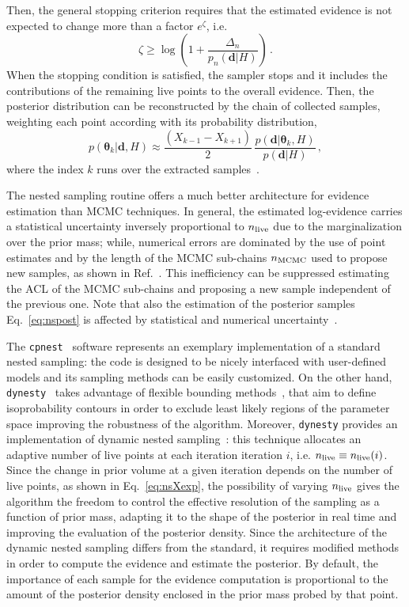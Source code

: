\documentclass[prd,aps,twocolumn,a4paper,showkeys,nofootinbib,floatfix]{revtex4-1}
\newcommand{\be}{\begin{equation}}
\newcommand{\ee}{\end{equation}}
\def\params{\boldsymbol{\theta}}
\def\data{\textbf{d}}
\begin{document}
Then, the general stopping criterion 
requires that the estimated evidence is not expected to 
change more than a factor $e^\zeta$, i.e.
\be
\label{eq:nsstop}
\zeta \ge \log \left(1+ \frac{\Delta_n}{p_n(\data|H)}\right) \,.
\ee
When the stopping condition is satisfied, the sampler stops and 
it includes the contributions of the remaining live points to the overall evidence.
Then, the posterior distribution can be reconstructed by the chain of collected samples, 
weighting each point according with its probability distribution,
\be
\label{eq:nspost}
p(\params_k|\data,H)\approx \frac{\left( X_{k-1} - X_{k+1}\right)}{2} \, \frac{p(\data|\params_k,H)}{p(\data|H)}\,,
\ee
where the index $k$ runs over the extracted samples~\cite{Hol2006_resampling}.

The nested sampling routine offers a much better architecture for 
evidence estimation than MCMC techniques.
In general, the estimated log-evidence carries a statistical uncertainty
inversely proportional to $n_{\rm live}$
due to the marginalization over the prior mass; while,
numerical errors are dominated by the use of point estimates and by
the length of the MCMC sub-chains $n_{\rm MCMC}$ used to propose new samples,
as shown in Ref.~\cite{Veitch:2009hd}. 
This inefficiency can be suppressed estimating the ACL 
of the MCMC sub-chains and proposing a new sample independent of the previous one. 
Note that also the estimation of the posterior samples Eq.~\eqref{eq:nspost} is affected by
statistical and numerical uncertainty~\cite{Higson_2018}.

 The {\tt cpnest}~\cite{cpnest} 
 software represents an exemplary implementation of a standard nested sampling:
 the code is designed to be nicely interfaced with user-defined models
 and its sampling methods can be easily customized.
 On the other hand, {\tt dynesty}~\cite{Speagle_2020}
 takes advantage of flexible bounding
 methods~\cite{2014arXiv1407.5459B,2017arXiv170704476B},
 that aim to define isoprobability contours 
 in order to exclude least likely regions of the parameter space
 improving the robustness of the algorithm.
  Moreover, {\tt dynesty} provides an implementation of 
 dynamic nested sampling~\cite{dynamic_ns}:
 this technique allocates an adaptive number of live points at each iteration iteration $i$,
 i.e. $n_{\rm live}\equiv n_{\rm live}(i)$. 
 Since the change in prior volume at a given iteration depends on the number of live points,
 as shown in Eq.~\eqref{eq:nsXexp}, 
the possibility of varying $n_{\rm live}$ gives the algorithm the freedom to 
control the effective resolution of the sampling as a function of prior mass,
adapting it to the shape of the posterior in real time and 
improving the evaluation of the posterior density.
Since the architecture of the dynamic nested sampling differs from the standard,
it requires modified methods in order to compute the evidence and estimate the posterior.
By default, the importance of each sample  for the evidence computation
is proportional to the amount of the posterior density 
enclosed in the prior mass probed by that point.
\end{document}
